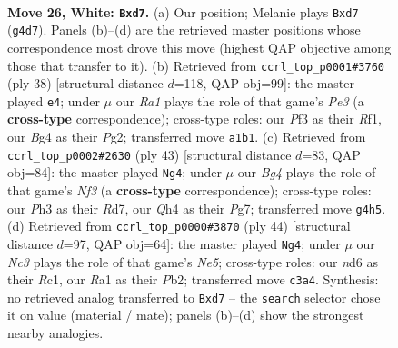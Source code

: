 \documentclass[11pt]{article}
\begin{document}
\clearpage

\begin{figure}[p]\centering
\begin{subfigure}{0.46\textwidth}\centering
\resizebox{\linewidth}{!}{%
\newchessgame
\chessboard[
  setfen={r1b5/pppp1ppk/3n3p/3P4/3b2BQ/2N2P1P/PPq3P1/R1B2K2 w - - 4 26},
  showmover=false,
  pgfstyle=straightmove, color=movearrow, markmove={g4-d7}
]}
\caption{}
\end{subfigure}\hfill
\begin{subfigure}{0.46\textwidth}\centering
\resizebox{\linewidth}{!}{%
\newchessgame
\chessboard[
  setfen={r1bn2k1/pp3ppp/5b2/2qB4/3N1B2/1QP1P3/5PPP/5RK1 w - - 5 20},
  showmover=false,
  pgfstyle=straightmove, color=movearrow, markmove={e3-e4}
]}
\caption{}
\end{subfigure}
\\[4pt]
\begin{subfigure}{0.46\textwidth}\centering
\resizebox{\linewidth}{!}{%
\newchessgame
\chessboard[
  setfen={6k1/3r1ppp/pQ1b1nb1/8/1pP5/3P2P1/PPB2P1P/R1B1qNK1 b - - 4 22},
  showmover=false,
  pgfstyle=straightmove, color=movearrow, markmove={f6-g4}
]}
\caption{}
\end{subfigure}\hfill
\begin{subfigure}{0.46\textwidth}\centering
\resizebox{\linewidth}{!}{%
\newchessgame
\chessboard[
  setfen={r5k1/pb3ppp/1p1qpb2/3nN3/Q2P4/P4B2/1P1B1PPP/2R3K1 w - - 5 23},
  showmover=false,
  pgfstyle=straightmove, color=movearrow, markmove={e5-g4}
]}
\caption{}
\end{subfigure}
\caption{\textbf{Move 26, White: \texttt{Bxd7}.} (a) Our position; Melanie plays \texttt{Bxd7} (\texttt{g4d7}). Panels (b)--(d) are the retrieved master positions whose correspondence most drove this move (highest QAP objective among those that transfer to it). (b) Retrieved from \texttt{ccrl\_top\_p0001\#3760} (ply 38) [structural distance $d$=118, QAP obj=99]: the master played \texttt{e4}; under $\mu$ our \emph{Ra1} plays the role of that game's \emph{Pe3} (a \textbf{cross-type} correspondence); cross-type roles: our \emph{P}f3 as their \emph{R}f1, our \emph{B}g4 as their \emph{P}g2; transferred move \texttt{a1b1}. (c) Retrieved from \texttt{ccrl\_top\_p0002\#2630} (ply 43) [structural distance $d$=83, QAP obj=84]: the master played \texttt{Ng4}; under $\mu$ our \emph{Bg4} plays the role of that game's \emph{Nf3} (a \textbf{cross-type} correspondence); cross-type roles: our \emph{P}h3 as their \emph{R}d7, our \emph{Q}h4 as their \emph{P}g7; transferred move \texttt{g4h5}. (d) Retrieved from \texttt{ccrl\_top\_p0000\#3870} (ply 44) [structural distance $d$=97, QAP obj=64]: the master played \texttt{Ng4}; under $\mu$ our \emph{Nc3} plays the role of that game's \emph{Ne5}; cross-type roles: our \emph{n}d6 as their \emph{R}c1, our \emph{R}a1 as their \emph{P}b2; transferred move \texttt{c3a4}. Synthesis: no retrieved analog transferred to \texttt{Bxd7} -- the \texttt{search} selector chose it on value (material / mate); panels (b)--(d) show the strongest nearby analogies.}
\label{fig:thought-m50}
\end{figure}
\end{document}
